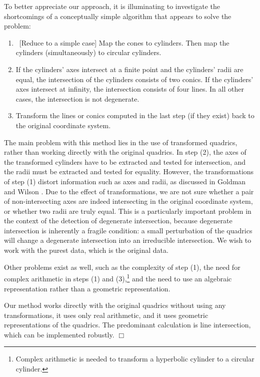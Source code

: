 \begin{remark} \rm
To better appreciate our approach, it is illuminating to investigate
the shortcomings of a conceptually simple algorithm that appears to
solve the problem:

\begin{enumerate}
\item
     \ [Reduce to a simple case] Map the cones to cylinders.
     Then map the cylinders (simultaneously) to circular cylinders.
\item
     If the cylinders' axes intersect at a finite point and the
     cylinders' radii are equal, the intersection of the cylinders consists
     of two conics.
     If the cylinders' axes intersect at infinity,
     the intersection consists of four lines.
     In all other cases, the intersection is not degenerate.
\item
     Transform the lines or conics
     computed in the last step (if they exist)
     back to the original coordinate system.
\end{enumerate}

\noindent The main problem with this method lies in the use of transformed
quadrics, rather than working directly with the original quadrics.
In step (2), the axes of the transformed cylinders have to be extracted
and tested for intersection, and the radii must be extracted and tested
for equality.
However, the transformations of step (1)
distort information such as axes and radii,
as discussed in Goldman \cite{goldman:1983b} and Wilson \cite{wilson:1987}.
Due to the effect of transformations, we are not sure whether a pair
of non-intersecting axes are indeed intersecting in the original
coordinate system, or whether two radii are truly equal.
This is a particularly important problem in the context of the detection
of degenerate intersection, because degenerate intersection is inherently
a fragile condition: a small perturbation of the quadrics will change a
degenerate intersection into an irreducible intersection.
We wish to work with the purest data, which is the original data.

Other problems exist as well, such as the complexity of step (1),
the need for complex arithmetic in steps (1) and (3),\footnote{Complex
     arithmetic is needed to transform a hyperbolic cylinder to a
     circular cylinder.}
and the need to use an algebraic representation
rather than a geometric representation.

Our method works directly with the original quadrics without using
any transformations, it uses only real arithmetic, and it uses geometric
representations of the quadrics.
The predominant calculation is line intersection, which can be implemented
robustly.
$\Box$
\end{remark}


